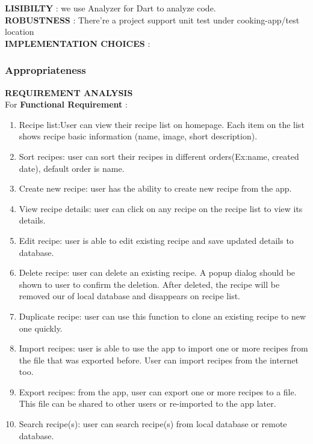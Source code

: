 \documentclass{article}
\begin{document}
 \textbf{LISIBILTY} : we use Analyzer for Dart to analyze code. \\
 \textbf{ROBUSTNESS}  :  There're a project support unit test under cooking-app/test location\\
 
 \textbf{IMPLEMENTATION CHOICES} : \\  

\subsubsection{Appropriateness}
\textbf{REQUIREMENT ANALYSIS  }\\

    For \textbf{ Functional Requirement} :   \\
    \begin{enumerate}
        \item  Recipe list:User can view their recipe list on homepage. Each item on the list shows recipe basic information (name, image, short description). \\
        \item Sort recipes: user can sort their recipes in different orders(Ex:name, created date), default order is name. 
        \item Create new recipe: user has the ability to create new recipe from the app.
        \item View recipe details: user can click on any recipe on the recipe list to view its details.
        \item Edit recipe: user is able to edit existing recipe and save updated details to database.
        \item Delete recipe: user can delete an existing recipe. A popup dialog should be shown to user to confirm the deletion. After deleted, the recipe will be removed our of local database and disappears on recipe list.
        \item  Duplicate recipe: user can use this function to clone an existing recipe to new one quickly.
        \item Import recipes: user is able to use the app to import one or more recipes from the file that was exported before. User can import recipes from the internet too.
        \item Export recipes: from the app, user can export one or more recipes to a file. This file can be shared to other users or re-imported to the app later.
        \item Search recipe(s): user can search recipe(s) from local database or remote database.

\end{enumerate}
\end{document}

